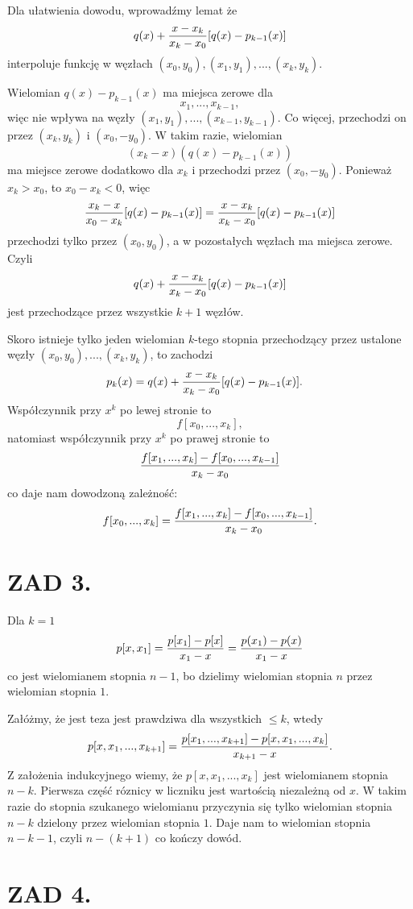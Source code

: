 \documentclass{article}[16pt]
\begin{document}
Dla ułatwienia dowodu, wprowadźmy lemat że 
$$q(x)+{x-x_k\over x_k-x_0}[q(x)-p_{k-1}(x)]$$
interpoluje funkcję w węzłach $(x_0,y_0),(x_1,y_1),...,(x_k,y_k)$.

Wielomian $q(x)-p_{k-1}(x)$ ma miejsca zerowe dla 
$$x_1,...,x_{k-1},$$ 
więc nie wpływa na węzły $(x_1,y_1),...,(x_{k-1},y_{k-1})$. Co więcej, przechodzi on przez $(x_k,y_k)$ i $(x_0, -y_0)$. W takim razie, wielomian 
$$(x_k-x)(q(x)-p_{k-1}(x))$$ 
ma miejsce zerowe dodatkowo dla $x_k$ i przechodzi przez $(x_0,-y_0)$. Ponieważ $x_k>x_0$, to $x_0-x_k<0$, więc
$${x_k-x\over x_0-x_k}[q(x)-p_{k-1}(x)]={x-x_k\over x_k-x_0}[q(x)-p_{k-1}(x)]$$
przechodzi tylko przez $(x_0,y_0)$, a w pozostałych węzłach ma miejsca zerowe. Czyli
$$q(x)+{x-x_k\over x_k-x_0}[q(x)-p_{k-1}(x)]$$
jest przechodzące przez wszystkie $k+1$ węzłów.
\medskip

Skoro istnieje tylko jeden wielomian $k$-tego stopnia przechodzący przez ustalone węzły $(x_0,y_0),...,(x_k,y_k)$, to zachodzi
\begin{align*}
    p_k(x)&=q(x)+{x-x_k\over x_k-x_0}[q(x)-p_{k-1}(x)].
\end{align*}
Współczynnik przy $x^k$ po lewej stronie to
$$f[x_0,...,x_k],$$
natomiast współczynnik przy $x^k$ po prawej stronie to
$${f[x_1,...,x_k]-f[x_0,...,x_{k-1}]\over x_k-x_0}$$
co daje nam dowodzoną zależność:
$$f[x_0,...,x_k]={f[x_1,...,x_k]-f[x_0,...,x_{k-1}]\over x_k-x_0}.$$

\section*{ZAD 3.}

    Dla $k=1$
    $$p[x, x_1]={p[x_1]-p[x]\over x_1-x}={p(x_1)-p(x)\over x_1-x}$$
    co jest wielomianem stopnia $n-1$, bo dzielimy wielomian stopnia $n$ przez wielomian stopnia $1$.
    \smallskip

    Załóżmy, że jest teza jest prawdziwa dla wszystkich $\leq k$, wtedy
    $$p[x, x_1,...,x_{k+1}]={p[x_1, ..., x_{k+1}]-p[x, x_1,...,x_k]\over x_{k+1}-x}.$$
    Z założenia indukcyjnego wiemy, że $p[x, x_1, ..., x_k]$ jest wielomianem stopnia $n-k$. Pierwsza część róznicy w liczniku jest wartością niezależną od $x$. W takim razie do stopnia szukanego wielomianu przyczynia się tylko wielomian stopnia $n-k$ dzielony przez wielomian stopnia $1$. Daje nam to wielomian stopnia $n-k-1$, czyli $n-(k+1)$ co kończy dowód.

\section*{ZAD 4.}
\end{document}
